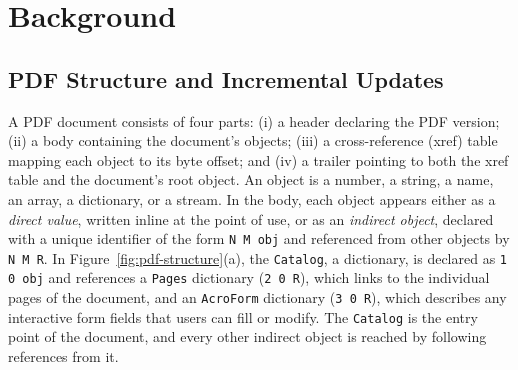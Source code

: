 \documentclass[12pt]{article}
\begin{document}
\section{Background} \label{sec:background}


\subsection{PDF Structure and Incremental Updates}

A PDF document consists of four parts: (i) a header declaring the PDF version; (ii) a body containing the document's objects; (iii) a cross-reference (xref) table mapping each object to its byte offset; and (iv) a trailer pointing to both the xref table and the document's root object.
%
An object is a number, a string, a name, an array, a dictionary, or a stream. In the body, each object appears either as a \emph{direct value}, written inline at the point of use, or as an \emph{indirect object}, declared with a unique identifier of the form \texttt{N M obj} and referenced from other objects by \texttt{N M R}. In Figure~\ref{fig:pdf-structure}(a), the \texttt{Catalog}, a dictionary, is declared as \texttt{1 0 obj} and references a \texttt{Pages} dictionary (\texttt{2 0 R}), which links to the individual pages of the document, and an \texttt{AcroForm} dictionary (\texttt{3 0 R}), which describes any interactive form fields that users can fill or modify. The \texttt{Catalog} is the entry point of the document, and every other indirect object is reached by following references from it.
\end{document}
